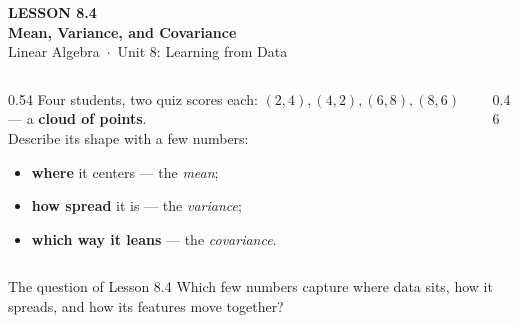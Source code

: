 \documentclass[aspectratio=169, 11pt]{beamer}
\begin{document}
{
\begin{frame}[plain]
  \vspace{2.8cm}\hspace{0.55cm}%
  \begin{minipage}{0.9\textwidth}
    {\color{goldacc}\bfseries\small LESSON 8.4}\\[0.5cm]
    {\color{white}\bfseries\LARGE Mean, Variance, and Covariance}\\[1.0cm]
    {\color{blushmid}\small Linear Algebra~$\cdot$~Unit 8: Learning from Data}
  \end{minipage}
\end{frame}
}

\begin{frame}[t, plain]
  \begin{columns}[T]
    \begin{column}{0.54\textwidth}
      Four students, two quiz scores each: $(2,4),(4,2),(6,8),(8,6)$ --- a \textbf{cloud of points}.\\[6pt]
      Describe its shape with a few numbers:
      \begin{itemize}
        \item \textbf{where} it centers --- the \emph{mean};
        \item \textbf{how spread} it is --- the \emph{variance};
        \item \textbf{which way it leans} --- the \emph{covariance}.
      \end{itemize}
    \end{column}
    \begin{column}{0.46\textwidth}
      \centering
    \end{column}
  \end{columns}
  \vspace{2pt}
  \begin{block}{The question of Lesson 8.4}
    Which few numbers capture where data sits, how it spreads, and how its features move together?
  \end{block}
\end{frame}
\end{document}
